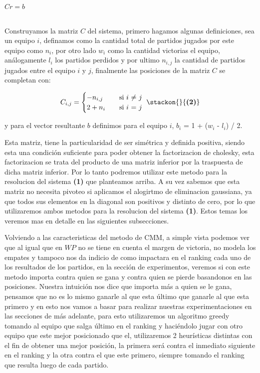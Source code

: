 \hfill $Cr=b$ \hfill {}

\\
Construyamos la matriz $C$ del sistema, primero hagamos algunas definiciones, sea un equipo $i$, definamos como la cantidad total de partidos jugados por este equipo como $n_i$, por otro lado $w_i$ como la cantidad victorias el equipo, análogamente $l_i$ los partidos perdidos y por ultimo $n_{i,j}$ la cantidad de partidos jugados entre el equipo $i$ y $j$, finalmente las posiciones de la matriz $C$ se completan con: 

\[ C_{i,j} =
    \begin{cases}
        -n_{i,j}       & \quad \text{si }  \text{$i$ $\neq$ $j$} \\
        2+n_i & \quad \text{si } \text{$i$ $=$ $j$ }\\
    \end{cases}\hfill \stackon{}{\textbf{(2)}}
$$
  $$  \]
                    
y para el vector resultante $b$ definimos para el equipo $i$, $b_i$ = 1 +  ($w_i$ - $l_i$) / 2.

Esta matriz, tiene la particularidad de ser simétrica y definida positiva, siendo esta una condición suficiente para poder obtener la factorizacion de cholesky, esta factorizacion se trata del producto de una matriz inferior por la traspuesta de dicha matriz inferior. Por lo tanto podremos utilizar este metodo para la resolucion del sistema \textbf{(1)} que planteamos arriba. A su vez sabemos que esta matriz no necesita pivoteo si aplicamos el alogirtmo de eliminacion gaussiana, ya que todos sus elementos en la diagonal son positivos y distinto de cero, por lo que utilizaremos ambos metodos para la resolucion del sistema \textbf{(1)}. Estos temas los veremos mas en detalle en las siguientes subsecciones.
    
Volviendo a las caracteristicas del metodo de CMM, a simple vista podemos ver que al igual que en $WP$ no se tiene en cuenta el margen de victoria, no modela los empates y tampoco nos da indicio de como impactara en el ranking cada uno de los resultados de los partidos, en la sección de experimentos, veremos si con este metodo importa contra quien se gana y contra quien se pierde basandonos en las posiciones. Nuestra intuición nos dice que importa más a quien se le gana, pensamos que no es lo mismo ganarle al que esta último que ganarle al que esta primero y en esto nos vamos a basar para realizar nuestras experimentaciones en las secciones de más adelante, para esto utilizaremos un algoritmo greedy tomando al equipo que salga último en el ranking y haciéndolo jugar con otro equipo que este mejor posicionado que el, utilizaremos 2 heurísticas distintas
con el fin de obtener una mejor posición, la primera será contra el inmediato siguiente en el ranking y la otra contra el que este primero, siempre tomando el ranking que resulta luego de cada partido.


